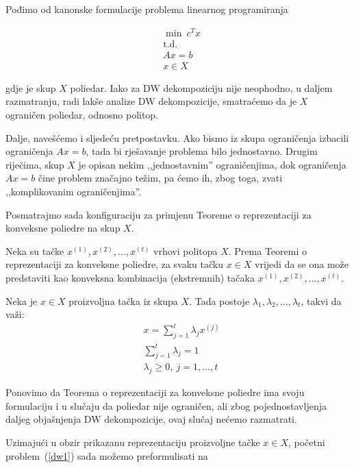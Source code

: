 \documentclass[b5paper, utf8, 11pt, colorlinks]{book}
\theoremstyle{definition}
\begin{document}
 Pođimo od kanonske formulacije problema linearnog programiranja
 
  \begin{equation}
 	\begin{aligned}\label{dw1}
 		&\min\ c^Tx\\
 		&\mbox{t.d.}\\
 	 &Ax=b\\
 		&x \in X
 	\end{aligned}
 \end{equation}
 
 gdje je skup $X$ poliedar. Iako za DW dekompoziciju nije neophodno, u daljem razmatranju, radi lakše analize DW dekompozicije, smatraćemo da je $X$ ograničen poliedar, odnosno politop.
 
 Dalje, navešćemo i sljedeću pretpostavku. Ako bismo iz skupa ograničenja izbacili ograničenja $Ax=b$, tada bi rješavanje problema bilo jednostavno. Drugim riječima, skup $X$ je opisan nekim ,,jednostavnim'' ograničenjima, dok ograničenja $Ax=b$ čine problem značajno težim, pa ćemo ih, zbog toga, zvati ,,komplikovanim ograničenjima''. 
 
 Posmatrajmo sada konfiguraciju za primjenu Teoreme o reprezentaciji za konveksne poliedre na skup $X$.
 
 Neka su tačke $x^{(1)},x^{(2)},\dots,x^{(t)}$ vrhovi politopa $X$.  
 Prema Teoremi o reprezentaciji za konveksne poliedre, za svaku tačku $x\in X$ vrijedi da se ona može predstaviti kao konveksna kombinacija (ekstremnih) tačaka $x^{(1)},x^{(2)},\dots,x^{(t)}$.
 
 Neka je  $x \in X$ proizvoljna tačka iz skupa $X$.  Tada postoje $\lambda_1,\lambda_2,\ldots,\lambda_t$, takvi da važi:
 \begin{equation}
 	\begin{aligned}
 		&x = \sum_{j=1}^t\lambda_jx^{(j)}\\
 		 &\sum_{j=1}^t\lambda_j = 1\\
 		&\lambda_j\geqslant 0,\ j = 1,\ldots,t
 	\end{aligned}
 \end{equation}
 
 Ponovimo da Teorema o reprezentaciji za konveksne poliedre ima svoju formulaciju i u slučaju da poliedar nije ograničen, ali zbog pojednostavljenja daljeg objašnjenja DW dekompozicije, ovaj slučaj nećemo razmatrati.
 
 Uzimajući u obzir prikazanu reprezentaciju proizvoljne tačke $x\in X$, početni problem~(\ref{dw1}) sada možemo preformulisati na
 
\end{document}
